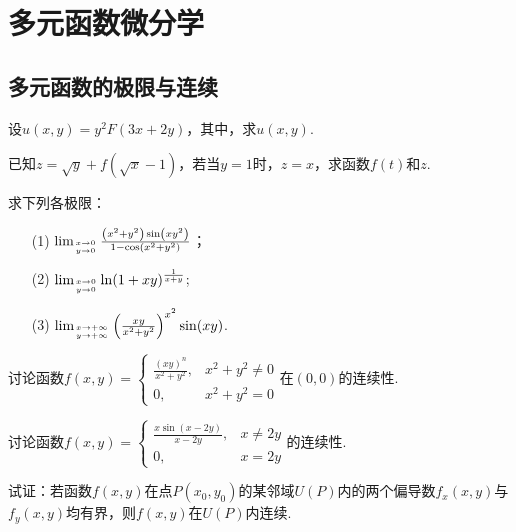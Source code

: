 \chapter{多元函数微分学}\label{cha:4}
\section{多元函数的极限与连续}
\begin{xiti}
	\item 	设$u(x, y)=y^{2} F(3 x+2 y)$，其中，求$u(x,y)$.
	\item 已知$z=\sqrt{y}+f(\sqrt{x}-1)$，若当$y=1$时，$z=x$，求函数$f(t)$和$z$.
	\item 求下列各极限：
	\begin{enumerate}
		\item [(1)]$\lim _{x \rightarrow 0 \atop y \rightarrow 0} \frac{\left(x^{2}+y^{2}\right) \sin \left(x y^{2}\right)}{1-\cos \left(x^{2}+y^{2}\right)}$；
		\item [(2)]$\lim _{x \rightarrow 0 \atop y \rightarrow 0} \ln (1+x y)^{\frac{1}{x+y}}$;
		\item [(3)]$\lim _{x \rightarrow+\infty \atop y \rightarrow+\infty}\left(\frac{x y}{x^{2}+y^{2}}\right)^{x^{2}} \sin (x y)$.
	\end{enumerate}
	\item 讨论函数$f(x, y)=\left\{\begin{array}{ll}{\frac{(x y)^{n}}{x^{2}+y^{2}},} & {x^{2}+y^{2} \neq 0} \\ {0,} & {x^{2}+y^{2}=0}\end{array}\right.$在$(0,0)$的连续性.
	\item 讨论函数$f(x, y)=\left\{\begin{array}{ll}{\frac{x \sin (x-2 y)}{x-2 y},} & {x \neq 2 y} \\ {0,} & {x=2 y}\end{array}\right.$的连续性.
	\item 试证：若函数$f(x,y)$在点$P(x_{0},y_{0})$的某邻域$U(P)$内的两个偏导数$f_{x}(x,y)$与$f_{y}(x,y)$均有界，则$f(x,y)$在$U(P)$内连续.
\end{xiti}



